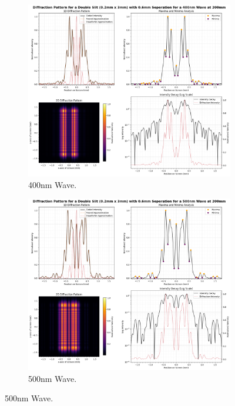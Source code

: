 \documentclass[12pt]{article}
\begin{document}
\begin{figure}[H]
    \centering
    \begin{subfigure}[b]{.48\textwidth}
        \centering
        \includegraphics[width=\linewidth]{dslit_400nm.png}
        \caption{400nm Wave.}
        \label{fig:12a}
    \end{subfigure}
    \hspace{-.5em}
    \begin{subfigure}[b]{.48\textwidth}
        \centering
        \includegraphics[width=\linewidth]{dslit_500nm.png}
        \caption{500nm Wave.}
        \label{fig:12b}
    \end{subfigure}
\end{figure}
\end{document}

